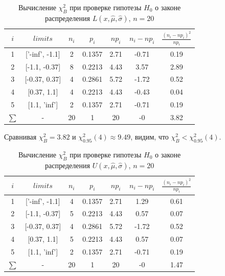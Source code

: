 \documentclass[a4paper]{article}
\begin{document}
\begin{table}[H]
	\centering
	\begin{tabular}{| c | c | c | c | c | c | c |}
		\hline
		$i$ & $limits$         &   $n_i$ &    $p_i$ &   $np_i$ &   $n_i - np_i$ &   $\frac{(n_i-np_i)^2}{np_i}$ \\
		\hline
   1 & ['-inf', -1.1] &     2 & 0.1357 &   2.71 &        -0.71 &                        0.19 \\
   2 & [-1.1, -0.37]  &     8 & 0.2213 &   4.43 &         3.57 &                        2.89 \\
   3 & [-0.37, 0.37]  &     4 & 0.2861 &   5.72 &        -1.72 &                        0.52 \\
   4 & [0.37, 1.1]    &     4 & 0.2213 &   4.43 &        -0.43 &                        0.04 \\
   5 & [1.1, 'inf']   &     2 & 0.1357 &   2.71 &        -0.71 &                        0.19 \\
   $\sum$ & -              &    20 & 1      &  20    &        -0    &                        3.82 \\
\hline
\end{tabular}
	\caption{ Вычисление $\chi^{2}_{B}$ при проверке гипотезы $H_{0}$ о законе распределения $L(x,\hat{\mu}, \hat{\sigma})$, $n=20$}
	\label{tab:laplace_chi_2}
\end{table}
\noindent Сравнивая $\chi^{2}_{B} = 3.82$ и $\chi^{2}_{0.95}(4) \approx 9.49$, видим, что $\chi^{2}_{B} < \chi^{2}_{0.95}(4)$.

\begin{table}[H]
	\centering
	\begin{tabular}{| c | c | c | c | c | c | c |}
	\hline
		$i$ & $limits$         &   $n_i$ &    $p_i$ &   $np_i$ &   $n_i - np_i$ &   $\frac{(n_i-np_i)^2}{np_i}$ \\
	\hline
   1 & ['-inf', -1.1] &     4 & 0.1357 &   2.71 &         1.29 &                        0.61 \\
   2 & [-1.1, -0.37]  &     5 & 0.2213 &   4.43 &         0.57 &                        0.07 \\
   3 & [-0.37, 0.37]  &     4 & 0.2861 &   5.72 &        -1.72 &                        0.52 \\
   4 & [0.37, 1.1]    &     5 & 0.2213 &   4.43 &         0.57 &                        0.07 \\
   5 & [1.1, 'inf']   &     2 & 0.1357 &   2.71 &        -0.71 &                        0.19 \\
   $\sum$ & -              &    20 & 1      &  20    &        -0    &                        1.47 \\
\hline
	\end{tabular}
	\caption{ Вычисление $\chi^{2}_{B}$ при проверке гипотезы $H_{0}$ о законе распределения $U(x,\hat{\mu}, \hat{\sigma})$, $n=20$}
	\label{tab:uniform_chi_2}
\end{table}
\end{document}
